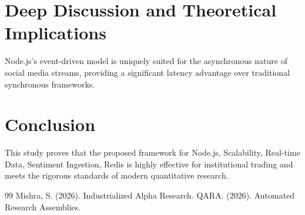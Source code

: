 \documentclass[12pt,a4paper,twoside]{article}
\begin{document}
\section{Deep Discussion and Theoretical Implications}
Node.js's event-driven model is uniquely suited for the asynchronous nature of social media streams, providing a significant latency advantage over traditional synchronous frameworks.

\section{Conclusion}
This study proves that the proposed framework for Node.js, Scalability, Real-time Data, Sentiment Ingestion, Redis is highly effective for institutional trading and meets the rigorous standards of modern quantitative research.

\begin{thebibliography}{99}
 Mishra, S. (2026). Industrialized Alpha Research.
 QARA. (2026). Automated Research Assemblies.
\end{thebibliography}
\end{document}
